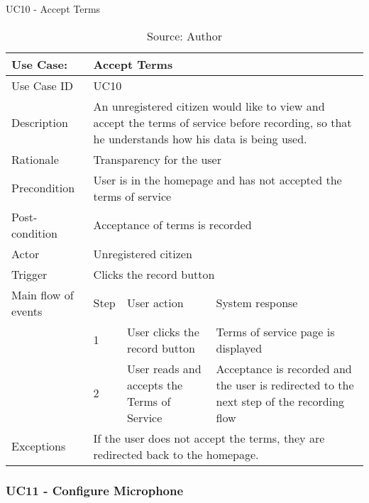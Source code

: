 \begin{table}[h]
\centering
\caption{UC10 - Accept Terms}
\label{uc:10}
\begin{tabular}{|p{3cm}|p{1cm}|p{5cm}|p{5cm}|}
\hline
Use Case:       & \multicolumn{3}{p{11cm}|}{Accept Terms} \\ \hline
Use Case ID     & \multicolumn{3}{p{11cm}|}{UC10} \\ \hline
Description     & \multicolumn{3}{p{11cm}|}{An unregistered citizen would like to view and accept the terms of service before recording, so that he understands how his data is being used.} \\ \hline
Rationale       & \multicolumn{3}{p{11cm}|}{Transparency for the user} \\ \hline
Precondition    & \multicolumn{3}{p{11cm}|}{User is in the homepage and has not accepted the terms of service} \\ \hline
Post-condition  & \multicolumn{3}{p{11cm}|}{Acceptance of terms is recorded} \\ \hline
Actor           & \multicolumn{3}{p{11cm}|}{Unregistered citizen} \\ \hline
Trigger         & \multicolumn{3}{p{11cm}|}{Clicks the record button} \\ \hline
Main flow of events & Step  & User action & System response \\ \hline
                    & 1     & User clicks the record button & Terms of service page is displayed \\ \hline
                    & 2     & User reads and accepts the Terms of Service & Acceptance is recorded and the user is redirected to the next step of the recording flow \\ \hline
Exceptions      & \multicolumn{3}{p{11cm}|}{If the user does not accept the terms, they are redirected back to the homepage.} \\ \hline
\end{tabular}
\caption*{Source: Author}
\end{table}



\subsubsection{UC11 - Configure Microphone}

